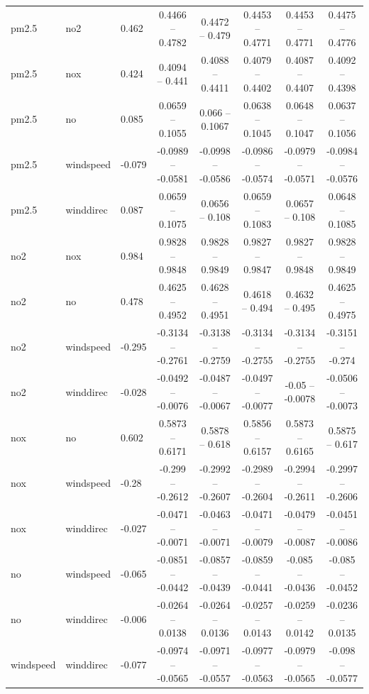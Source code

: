 \documentclass{beamer}
\begin{document}
\begin{frame}
{\begin{tabular}{lllccccc}
      pm2.5     & no2       & 0.462  & 0.4466  -- 0.4782  & 0.4472  -- 0.479   & 0.4453  -- 0.4771  & 0.4453  -- 0.4771  & 0.4475  -- 0.4776 \\
      pm2.5     & nox       & 0.424  & 0.4094  -- 0.441   & 0.4088  -- 0.4411  & 0.4079  -- 0.4402  & 0.4087  -- 0.4407  & 0.4092  -- 0.4398 \\
      pm2.5     & no        & 0.085  & 0.0659  -- 0.1055  & 0.066   -- 0.1067  & 0.0638  -- 0.1045  & 0.0648  -- 0.1047  & 0.0637  -- 0.1056 \\
      pm2.5     & windspeed & -0.079 & -0.0989 -- -0.0581 & -0.0998 -- -0.0586 & -0.0986 -- -0.0574 & -0.0979 -- -0.0571 & -0.0984 -- -0.0576 \\
      pm2.5     & winddirec & 0.087  & 0.0659  -- 0.1075  & 0.0656  -- 0.108   & 0.0659  -- 0.1083  & 0.0657  -- 0.108   & 0.0648  -- 0.1085 \\
      no2       & nox       & 0.984  & 0.9828  -- 0.9848  & 0.9828  -- 0.9849  & 0.9827  -- 0.9847  & 0.9827  -- 0.9848  & 0.9828  -- 0.9849 \\
      no2       & no        & 0.478  & 0.4625  -- 0.4952  & 0.4628  -- 0.4951  & 0.4618  -- 0.494   & 0.4632  -- 0.495   & 0.4625  -- 0.4975 \\
      no2       & windspeed & -0.295 & -0.3134 -- -0.2761 & -0.3138 -- -0.2759 & -0.3134 -- -0.2755 & -0.3134 -- -0.2755 & -0.3151 -- -0.274 \\
      no2       & winddirec & -0.028 & -0.0492 -- -0.0076 & -0.0487 -- -0.0067 & -0.0497 -- -0.0077 & -0.05   -- -0.0078 & -0.0506 -- -0.0073 \\
      nox       & no        & 0.602  & 0.5873  -- 0.6171  & 0.5878  -- 0.618   & 0.5856  -- 0.6157  & 0.5873  -- 0.6165  & 0.5875  -- 0.617   \\
      nox       & windspeed & -0.28  & -0.299  -- -0.2612 & -0.2992 -- -0.2607 & -0.2989 -- -0.2604 & -0.2994 -- -0.2611 & -0.2997 -- -0.2606 \\
      nox       & winddirec & -0.027 & -0.0471 -- -0.0071 & -0.0463 -- -0.0071 & -0.0471 -- -0.0079 & -0.0479 -- -0.0087 & -0.0451 -- -0.0086 \\
      no        & windspeed & -0.065 & -0.0851 -- -0.0442 & -0.0857 -- -0.0439 & -0.0859 -- -0.0441 & -0.085  -- -0.0436 & -0.085  -- -0.0452 \\
      no        & winddirec & -0.006 & -0.0264 -- 0.0138  & -0.0264 -- 0.0136  & -0.0257 -- 0.0143  & -0.0259 -- 0.0142  & -0.0236 -- 0.0135  \\
      windspeed & winddirec & -0.077 & -0.0974 -- -0.0565 & -0.0971 -- -0.0557 & -0.0977 -- -0.0563 & -0.0979 -- -0.0565 & -0.098  -- -0.0577 \\
    \end{tabular}
  }
\end{frame}
\end{document}
